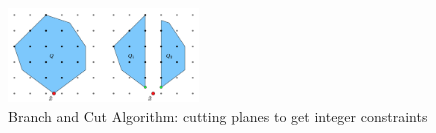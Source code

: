     \begin{figure}[h]
        \centering
        \includegraphics[width=0.45\textwidth]{figs/branch_and_cut.png}
        \caption{Branch and Cut Algorithm: cutting planes to get integer constraints}
        \label{fig:branch_and_cut}
    \end{figure}